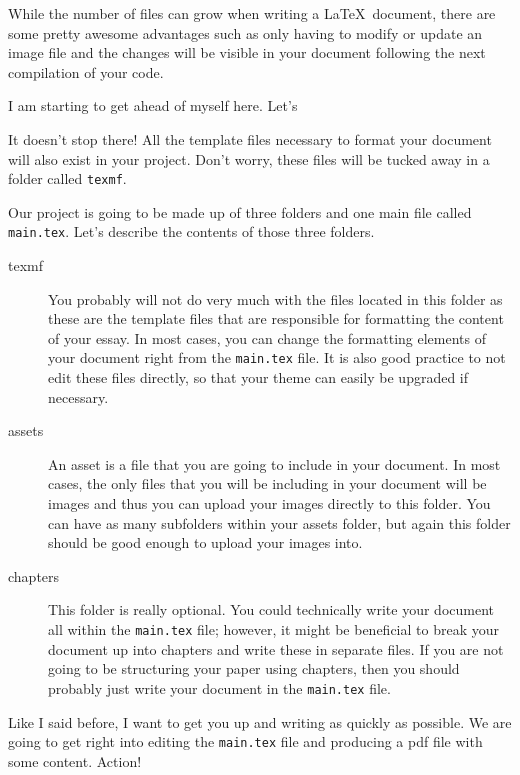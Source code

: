 While the number of files can grow when writing a \LaTeX ~document, there are 
some pretty awesome advantages such as only having to modify or update an 
image file and the changes will be visible in your document following the 
next compilation of your code.

I am starting to get ahead of myself here. Let's 

It doesn't stop there!  All the template files necessary to format your document
will also exist in your project.  Don't worry, these files will be tucked away
in a folder called \texttt{texmf}.




Our project is going to be made up of three folders and one main file called
\texttt{main.tex}. Let's describe the contents of those three folders.
\begin{description}
  \item[texmf] You probably will not do very much with the files located
        in this folder as these are the template files that are responsible for
        formatting the content of your essay. In most cases, you can change
        the formatting elements of your document right from the
        \texttt{main.tex} file.  It is also good practice to not edit these
        files directly, so that your theme can easily be upgraded if necessary.
  \item[assets] An asset is a file that you are going to include in your
        document.  In most cases, the only files that you will be including
        in your document will be images and thus you can upload your images
        directly to this folder.  You can have as many subfolders within your
        assets folder, but again this folder should be good enough to upload
        your images into.
  \item[chapters] This folder is really optional.  You could technically write
        your document all within the \texttt{main.tex} file; however, it might
        be beneficial to break your document up into chapters and
        write these in separate files.  If you are not going to be structuring
        your paper using chapters, then you should probably just write your
        document in the \texttt{main.tex} file.
\end{description}

Like I said before, I want to get you up and writing as quickly as possible.
We are going to get right into editing the \texttt{main.tex} file and producing
a pdf file with some content.  Action!

